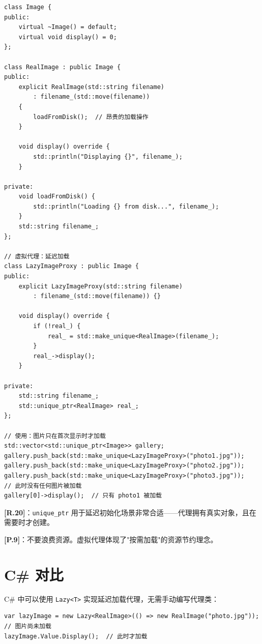\documentclass[12pt,a4paper,fontset=fandol]{ctexbook}
\newcommand{\guideref}[1]{\textbf{\textcolor{blue!70!black}{[#1]}}}
\begin{document}
\begin{lstlisting}[style=cppstyle, caption={代理模式 --- 虚拟代理}]
class Image {
public:
    virtual ~Image() = default;
    virtual void display() = 0;
};

class RealImage : public Image {
public:
    explicit RealImage(std::string filename)
        : filename_(std::move(filename))
    {
        loadFromDisk();  // 昂贵的加载操作
    }

    void display() override {
        std::println("Displaying {}", filename_);
    }

private:
    void loadFromDisk() {
        std::println("Loading {} from disk...", filename_);
    }
    std::string filename_;
};

// 虚拟代理：延迟加载
class LazyImageProxy : public Image {
public:
    explicit LazyImageProxy(std::string filename)
        : filename_(std::move(filename)) {}

    void display() override {
        if (!real_) {
            real_ = std::make_unique<RealImage>(filename_);
        }
        real_->display();
    }

private:
    std::string filename_;
    std::unique_ptr<RealImage> real_;
};

// 使用：图片只在首次显示时才加载
std::vector<std::unique_ptr<Image>> gallery;
gallery.push_back(std::make_unique<LazyImageProxy>("photo1.jpg"));
gallery.push_back(std::make_unique<LazyImageProxy>("photo2.jpg"));
gallery.push_back(std::make_unique<LazyImageProxy>("photo3.jpg"));
// 此时没有任何图片被加载
gallery[0]->display();  // 只有 photo1 被加载
\end{lstlisting}

\begin{guideline}
\guideref{R.20}：\texttt{unique\_ptr} 用于延迟初始化场景非常合适——代理拥有真实对象，且在需要时才创建。

\guideref{P.9}：不要浪费资源。虚拟代理体现了"按需加载"的资源节约理念。
\end{guideline}

\section{C\# 对比}

C\# 中可以使用 \texttt{Lazy<T>} 实现延迟加载代理，无需手动编写代理类：

\begin{lstlisting}[style=csharpstyle, caption={C\# 延迟加载}]
var lazyImage = new Lazy<RealImage>(() => new RealImage("photo.jpg"));
// 图片尚未加载
lazyImage.Value.Display();  // 此时才加载
\end{lstlisting}
\end{document}
